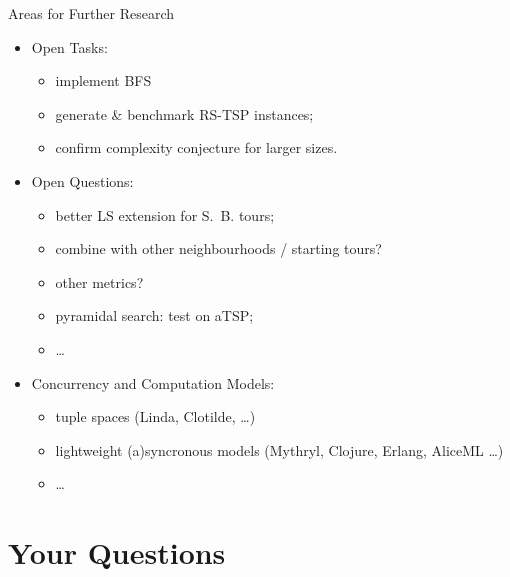 \documentclass[
  size=8pt,
  style=klope,
  paper=screen,
  mode=present,
  nohandoutpagebreaks,
  pauseslide,
  hlsections,
  fleqn,
]{powerdot}
\begin{document}
\begin{slide}{Areas for Further Research}
{\small

  \begin{itemize}
  \item
  Open Tasks:
    \begin{itemize}
      \item implement BFS
      \item generate \& benchmark RS-TSP instances;
      \item confirm complexity conjecture for larger sizes.
    \end{itemize}
  \item
  Open Questions:
    \begin{itemize}
    \item better LS extension for S.\ B. tours;
    \item combine with other neighbourhoods / starting tours?
    \item other metrics?
    \item pyramidal search: test on aTSP;
    \item \ldots
    \end{itemize}
  \item
  Concurrency and Computation Models:
    \begin{itemize}
    \item tuple spaces (Linda, Clotilde, \ldots)
    \item lightweight (a)syncronous models (Mythryl, Clojure, Erlang, AliceML \ldots)
    \item \ldots
    \end{itemize}
  \end{itemize}

}
\end{slide}


\section[template=wideslide]{Your Questions}
\end{document}
